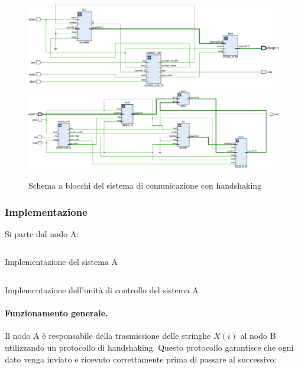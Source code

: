 \begin{figure}[h]
    \centering
    \includegraphics[width=\linewidth]{img/8_1_HANDSHAKING_A.pdf}
    \includegraphics[width=\linewidth]{img/8_1_HANDSHAKING_B.pdf}
    \caption{Schema a blocchi del sistema di comunicazione con handshaking}
    \label{fig:8_1_HANDSHAKING}
\end{figure}

\subsubsection{Implementazione}
Si parte dal nodo A:

\begin{code}
    \inputminted{vhdl}{vhdl/handshaking_system_A.vhd}
    \caption{Implementazione del sistema A}
    \label{cod:handshaking_system_A}
\end{code}

\begin{code}
    \inputminted{vhdl}{vhdl/handshaking_control_unit_A.vhd}
    \caption{Implementazione dell'unità di controllo del sistema A}
    \label{cod:handshaking_control_unit_A}
\end{code}

\paragraph{Funzionamento generale.}
Il nodo A è responsabile della trasmissione delle stringhe $X(i)$ al nodo B utilizzando un protocollo di handshaking. Questo protocollo garantisce che ogni dato venga inviato e ricevuto correttamente prima di passare al successivo:

